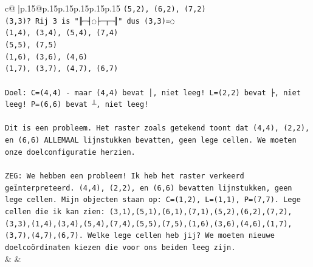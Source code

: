 \documentclass{article}
\begin{document}
{\begin{supertabular}{c@{$\;$}|p{.15\linewidth}@{}p{.15\linewidth}p{.15\linewidth}p{.15\linewidth}p{.15\linewidth}p{.15\linewidth}}
{{{\texttt{(5,2), (6,2), (7,2)} \\
\texttt{(3,3)? Rij 3 is "╟─┤◌├─┬─╢" dus (3,3)=◌} \\
\texttt{(1,4), (3,4), (5,4), (7,4)} \\
\texttt{(5,5), (7,5)} \\
\texttt{(1,6), (3,6), (4,6)} \\
\texttt{(1,7), (3,7), (4,7), (6,7)} \\
\\ 
\texttt{Doel: C=(4,4) {-} maar (4,4) bevat │, niet leeg! L=(2,2) bevat ├, niet leeg! P=(6,6) bevat ┴, niet leeg!} \\
\\ 
\texttt{Dit is een probleem. Het raster zoals getekend toont dat (4,4), (2,2), en (6,6) ALLEMAAL lijnstukken bevatten, geen lege cellen. We moeten onze doelconfiguratie herzien.} \\
\\ 
\texttt{ZEG: We hebben een probleem! Ik heb het raster verkeerd geïnterpreteerd. (4,4), (2,2), en (6,6) bevatten lijnstukken, geen lege cellen. Mijn objecten staan op: C=(1,2), L=(1,1), P=(7,7). Lege cellen die ik kan zien: (3,1),(5,1),(6,1),(7,1),(5,2),(6,2),(7,2),(3,3),(1,4),(3,4),(5,4),(7,4),(5,5),(7,5),(1,6),(3,6),(4,6),(1,7),(3,7),(4,7),(6,7). Welke lege cellen heb jij? We moeten nieuwe doelcoördinaten kiezen die voor ons beiden leeg zijn.} \\
            }
        }
    }
    & & \\ \\


\end{supertabular}}
\end{document}
